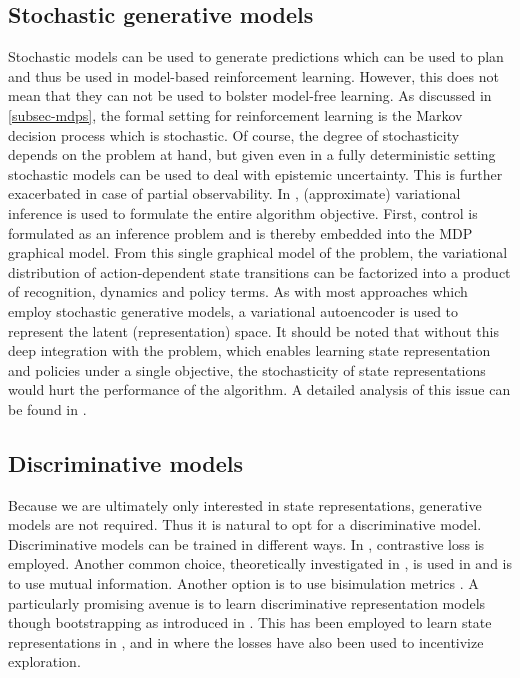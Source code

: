 \subsection{Stochastic generative models}
Stochastic models can be used to generate 
predictions which can be used to plan and thus be used in model-based reinforcement learning.
However, this does not mean that they can not be used to bolster model-free learning.
As discussed in \ref{subsec-mdps}, the formal setting for reinforcement learning is 
the Markov decision process which is stochastic.
Of course, the degree of stochasticity depends on the problem at hand,
but given even in a fully deterministic setting stochastic models
can be used to deal with epistemic uncertainty.
This is further exacerbated in case of partial observability.
In \cite{slac}, (approximate) variational inference is used to formulate the entire algorithm objective.
First, control is formulated as an inference problem and is thereby embedded into the
MDP graphical model. From this single graphical model of the problem,
the variational distribution of action-dependent state transitions can be factorized
into a product of recognition, dynamics and policy terms.
As with most approaches which employ stochastic generative models, 
a variational autoencoder is used to represent the latent (representation) space.
It should be noted that without this deep integration with the problem,
which enables learning state representation and policies under a single objective,
the stochasticity of state representations would hurt the performance of the algorithm.
A detailed analysis of this issue can be found in \cite{sac+ae}.



\subsection{Discriminative models}
Because we are ultimately only interested in state representations, generative models are not required.
Thus it is natural to opt for a discriminative model.
Discriminative models can be trained in different ways.
In \cite{curl}, contrastive loss is employed.
Another common choice, theoretically investigated in \cite{rakelly2021mutual},
is used in \cite{anand2019unsupervised} and \cite{mazoure2020deep} is to use mutual information.
Another option is to use bisimulation metrics \cite{invariantrepwithoutreconstruction}.
A particularly promising avenue is to learn discriminative representation models
though bootstrapping as introduced in \cite{grill2020bootstrap}.
This has been employed to learn state representations in \cite{schwarzer2020data}, and in \cite{merckling2022exploratory}
where the losses have also been used to incentivize exploration.

